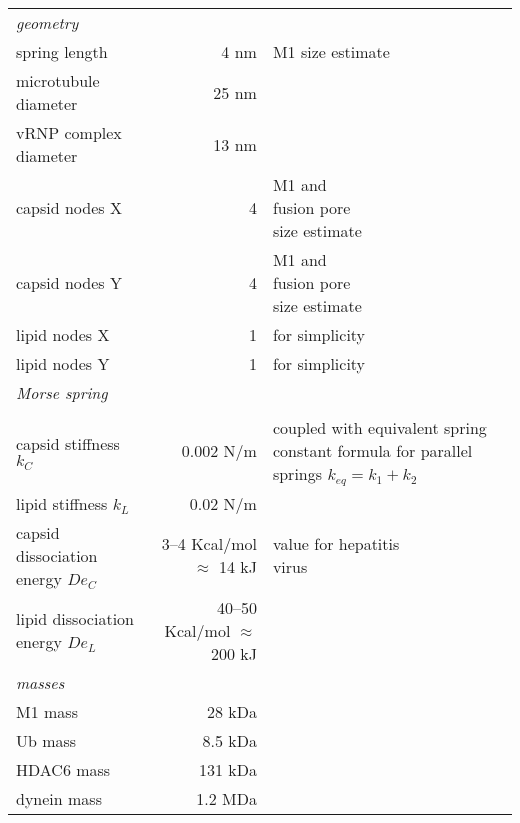 \begin{longtable}{lrl}
\multicolumn{3}{l}{\textit{geometry}}\\
spring length & 4 nm & M1 size estimate \cite{hilsch2014influenza}\\
microtubule diameter & 25 nm & \cite{microtubule_diameter}\\
vRNP complex diameter & 13 nm & \cite{noda2012three}\\
capsid nodes X &4 & \makecell[l]{M1 \cite{hilsch2014influenza} and\\fusion pore \cite{lee2010architecture}\\size estimate}\\
capsid nodes Y &4 & \makecell[l]{M1 \cite{hilsch2014influenza} and\\fusion pore \cite{lee2010architecture}\\size estimate}\\
lipid nodes X &1 & for simplicity\\
lipid nodes Y &1 & for simplicity\\
\midrule
\multicolumn{3}{l}{\textit{Morse spring}}\\
\\capsid stiffness $k_C$ & 0.002 N/m & \makecell[l]{\cite{li2014ph} coupled with\\equivalent spring \\constant formula\\for parallel springs\\$k_{eq} = k_1 + k_2$}\\
lipid stiffness $k_L$ & 0.02 N/m & \cite{li2014ph}\\
\makecell[l]{capsid dissociation\\energy $De_C$} &\makecell[r]{3–4 Kcal/mol\\$\approx$ 14 kJ} & \makecell[l]{value for hepatitis\\virus \cite{ceres2004hepatitis}}\\
\makecell[l]{lipid dissociation\\energy $De_L$} &\makecell[r]{40–50 Kcal/mol\\$\approx$ 200 kJ} & \cite{lorizate2011role}\\
\midrule
\multicolumn{3}{l}{\textit{masses}}\\
M1 mass &28 kDa & \cite{shtykova2013structural}\\
Ub mass &8.5 kDa & \cite{goldstein1975isolation}\\
HDAC6 mass &131 kDa & \cite{hdac6_mass}\\
dynein mass &1.2 MDa & \cite{gao2006simple}\\

\end{longtable}

